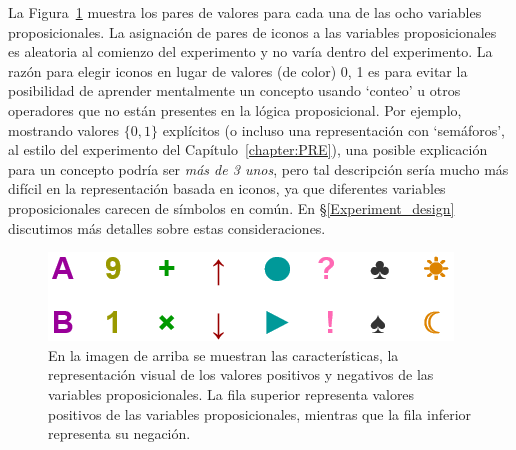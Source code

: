 La Figura~\ref{Figure:references} muestra los pares de valores para cada una de las ocho variables proposicionales. La asignación de pares de iconos a las variables proposicionales es aleatoria al comienzo del experimento y no varía dentro del experimento.
La razón para elegir iconos en lugar de valores (de color) 0, 1 es para evitar la posibilidad de aprender mentalmente un concepto usando `conteo' u otros operadores que no están presentes en la lógica proposicional. Por ejemplo, mostrando valores $ \{0,1 \} $ explícitos (o incluso una representación con `semáforos', al estilo del experimento del Capítulo~\ref{chapter:PRE}), una posible explicación para un concepto podría ser {\em más de 3 unos}, pero tal descripción sería mucho más difícil en la representación basada en iconos, ya que diferentes variables proposicionales carecen de símbolos en común. En \S\ref{Experiment_design} discutimos más detalles sobre estas consideraciones.

\begin{figure}[h!]
\begin{center}
    \includegraphics[scale=2]{../figuras/brm/Features8.png}
	\caption{
	En la imagen de arriba se muestran las características, la representación visual de los valores positivos y negativos de las variables proposicionales. La fila superior representa valores positivos de las variables proposicionales, mientras que la fila inferior representa su negación.}
	\label{Figure:references}
\end{center}
\end{figure}


